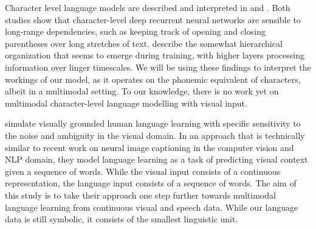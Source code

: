 
Character level language models are described and interpreted in  and . Both studies show that character-level deep recurrent neural networks are sensible to long-range dependencies, such as keeping track of opening and closing parentheses over long stretches of text.  describe the somewhat hierarchical organization that seems to emerge during training, with higher layers processing information over linger timescales. We will be using these findings to interpret the workings of our model, as it operates on the phonemic equivalent of characters, albeit in a multimodal setting. To our knowledge, there is no work yet on multimodal character-level language modelling with visual input. %


 simulate visually grounded human language learning with specific sensitivity to the noise and ambiguity in the visual domain. In an approach that is technically similar to recent work on neural image captioning in the computer vision and NLP domain, they model language learning as a task of predicting visual context given a sequence of words. While the visual input consists of a continuous representation, the language input consists of a sequence of words. The aim of this study is to take their approach one step further towards multimodal language learning from continuous visual and speech data. While our language data is still symbolic, it consists of the smallest linguistic unit.


